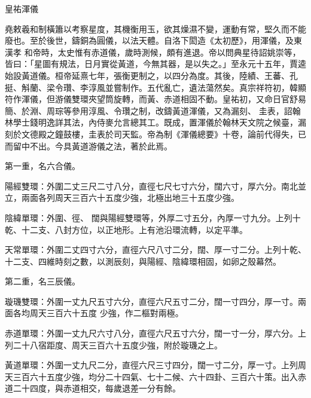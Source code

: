 
\begin{pinyinscope}

 皇祐渾儀



 堯敕羲和制橫簫以考察星度，其機衡用玉，欲其燥濕不變，運動有常，堅久而不能廢也。至於後世，鑄銅為圓儀，以法天體。自洛下閎造《太初歷》，用渾儀，及東漢孝
 和帝時，太史惟有赤道儀，歲時測候，頗有進退。帝以問典星待詔姚崇等，皆曰：「星圖有規法，日月實從黃道，今無其器，是以失之。」至永元十五年，賈逵始設黃道儀。桓帝延熹七年，張衡更制之，以四分為度。其後，陸績、王蕃、孔挺、斛蘭、梁令瓚、李淳風並嘗制作。五代亂亡，遺法蕩然矣。真宗祥符初，韓顯符作渾儀，但游儀雙環夾望筒旋轉，而黃、赤道相固不動。皇祐初，又命日官舒易簡、於淵、周琮等參用淳風、令瓚之制，改鑄黃道渾儀，又為漏刻、
 圭表，詔翰林學士錢明逸詳其法，內侍麥允言總其工。既成，置渾儀於翰林天文院之候臺，漏刻於文德殿之鐘鼓樓，圭表於司天監。帝為制《渾儀總要》十卷，論前代得失，已而留中不出。今具黃道游儀之法，著於此焉。



 第一重，名六合儀。



 陽經雙環：外圍二丈三尺二寸八分，直徑七尺七寸六分，闊六寸，厚六分。南北並立，兩面各列周天三百六十五度少強，北極出地三十五度少強。



 陰緯單環：外圍、徑、
 闊與陽經雙環等，外厚二寸五分，內厚一寸九分。上列十乾、十二支、八封方位，以正地形。上有池沿環流轉，以定平準。



 天常單環：外圍二丈四寸六分，直徑六尺八寸二分，闊、厚一寸二分。上列十乾、十二支、四維時刻之數，以測辰刻，與陽經、陰緯環相固，如卵之殼幕然。



 第二重，名三辰儀。



 璇璣雙環：外圍一丈九尺五寸六分，直徑六尺五寸二分，闊一寸四分，厚一寸。兩面各均周天三百六十五度
 少強，作二樞對兩極。



 赤道單環：外圍一丈九尺六寸八分，直徑六尺五寸六分，闊一寸一分，厚六分。上列二十八宿距度、周天三百六十五度少強，附於璇璣之上。



 黃道單環：外圍一丈九尺二分，直徑六尺三寸四分，闊一寸二分，厚一寸。上列周天三百六十五度少強，均分二十四氣、七十二候、六十四卦、三百六十策。出入赤道二十四度，與赤道相交，每歲退差一分有餘。




\end{pinyinscope}
